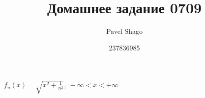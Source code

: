 \documentclass{report}
\title{\Huge{Домашнее задание 0709}}
\author{\huge{Pavel Shago}}
\date{237836985}
\begin{document}
\maketitle{}

\ $ f_n(x) = \sqrt{x^2 + \frac{1}{n^2}},\ -\infty < x < +\infty $
\end{document}
